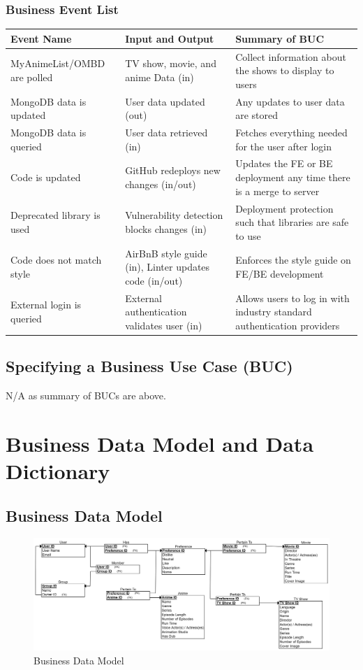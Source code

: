 \documentclass[12pt]{article}
\begin{document}
\subsubsection*{Business Event List}
\begin{tabularx}{\textwidth}{|p{4cm}p{6cm}X|}
\toprule {\bf Event Name} & {\bf Input and Output} & {\bf Summary of BUC}\\
\hline
MyAnimeList/OMBD are polled & TV show, movie, and anime Data (in) & Collect information about the shows to display to users \\
\hline
MongoDB data is updated & User data updated (out) & Any updates to user data are stored \\
\hline
MongoDB data is queried & User data retrieved (in) & Fetches everything needed for the user after login \\
\hline
Code is updated & GitHub redeploys new changes (in/out) & Updates the FE or BE deployment any time there is a merge to server \\
\hline
Deprecated library is used & Vulnerability detection blocks changes (in) & Deployment protection such that libraries are safe to use \\
\hline
Code does not match style & AirBnB style guide (in), Linter updates code (in/out) & Enforces the style guide on FE/BE development \\
\hline
External login is queried & External authentication validates user (in) & Allows users to log in with industry standard authentication providers \\
\hline
\end{tabularx}

\subsection{Specifying a Business Use Case (BUC)}
N/A as summary of BUCs are above.

\pagebreak
\section{Business Data Model and Data Dictionary}
\subsection{Business Data Model}
\begin{figure}[h]
\begin{center}
	\includegraphics[scale=0.12]{BusinessDataModel.png}
\end{center}
\caption{Business Data Model}
\end{figure}
\end{document}
